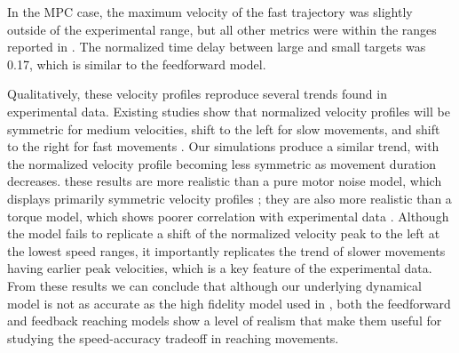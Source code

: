 \documentclass[letterpaper, 10pt, conference]{ieeeconf}
\begin{document}
In the MPC case, the maximum velocity of the fast trajectory was slightly outside of the experimental range, but all other metrics were within the ranges reported in \cite{soechting_target_size}.
The normalized time delay between large and small targets was 0.17, which is similar to the feedforward model.

Qualitatively, these velocity profiles reproduce several trends found in experimental data.
Existing studies show that normalized velocity profiles will be symmetric for medium velocities, shift to the left for slow movements, and shift to the right for fast movements \cite{asymmetric_vel_acc}\cite{human_vel_curves}. 
Our simulations produce a similar trend, with the normalized velocity profile becoming less symmetric as movement duration decreases.
these results are more realistic than a pure motor noise model, which displays primarily symmetric velocity profiles \cite{signal_dependent_motor_noise}; they are also more realistic than a torque model, which shows poorer correlation with experimental data \cite{original_paper_high_fidelity}.
Although the model fails to replicate a shift of the normalized velocity peak to the left at the lowest speed ranges, it importantly replicates the trend of slower movements having earlier peak velocities, which is a key feature of the experimental data.
From these results we can conclude that although our underlying dynamical model is not as accurate as the high fidelity model used in \cite{original_paper_high_fidelity}, both the feedforward and feedback reaching models show a level of realism that make them useful for studying the speed-accuracy tradeoff in reaching movements.

\end{document}
